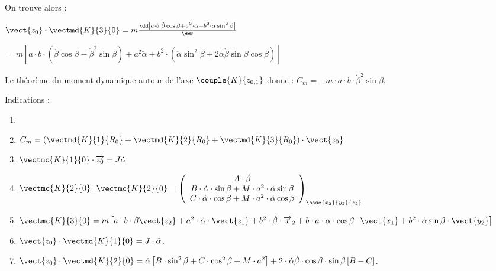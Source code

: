 \begin{multicols}{2}
\begin{corrige}
On trouve alors : 

$
\vect{z_0}\cdot \vectmd{K}{3}{0}=
m\frac{\dd\left[a\cdot b\cdot \dot{\beta}\cos\beta+a^2\cdot \dot{\alpha}+b^2\cdot \dot{\alpha}\sin^2\beta\right]}{\dd t}
$

$=m\left[a\cdot b\cdot \left(\ddot{\beta}\cos\beta-\dot{\beta}^2\sin\beta\right)+a^2\ddot{\alpha}+b^2\cdot\left(\ddot{\alpha}\sin^2\beta+2\dot{\alpha}\dot{\beta}\sin\beta\cos\beta\right)\right]
$

\end{corrige}
\else
\fi



\ifprof
\begin{corrige}
Le théorème du moment dynamique autour de l'axe $\couple{K}{{z}_{0,1}}$ donne :
$
C_m=-m\cdot a\cdot b\cdot \dot{\beta}^2\sin\beta
$.

\end{corrige}
\else
\fi


\ifprof
\else
\ifcolle
\else
\footnotesize
Indications : 
\begin{enumerate}
\item 
\item $C_m=\left(\vectmd{K}{1}{R_0}+\vectmd{K}{2}{R_0}+\vectmd{K}{3}{R_0}\right)\cdot \vect{z_0}$
\item  $ \vectmc{K}{1}{0}\cdot\overrightarrow{z_0} = J \dot{\alpha}$
\item  $\vectmc{K}{2}{0}$: $
\vectmc{K}{2}{0}=\left(
\begin{array}{c}
A\cdot \dot{\beta}\\
B\cdot \dot{\alpha}\cdot \sin\beta+M\cdot a^2\cdot \dot{\alpha}\sin\beta\\
C\cdot \dot{\alpha}\cdot \cos\beta+M\cdot a^2\cdot \dot{\alpha}\cos\beta\\
\end{array}
\right)_{\base{{x}_2}{{y}_2}{{z}_2}}\\
$
\item $
\vectmc{K}{3}{0}=m\left[a\cdot b\cdot\dot{\beta} \vect{z_2}+a^2\cdot \dot{\alpha}\cdot\vect{z_{1}}+b^2\cdot \dot{\beta}\cdot\overrightarrow{x}_2+b\cdot a\cdot \dot{\alpha}\cdot \cos\beta\cdot \vect{x_{1}}+b^2\cdot \dot{\alpha}\sin\beta\cdot \vect{y_{2}}\right]
$
\item $\vect{z_0}\cdot \vectmd{K}{1}{0}=J\cdot \ddot{\alpha}$.
\item $\vect{z_0}\cdot \vectmd{K}{2}{0}=\ddot{\alpha}\left[B\cdot \sin^2\beta+C\cdot \cos^2\beta+M\cdot a^2\right]
+2\cdot\dot{\alpha}\dot{\beta}\cdot \cos\beta\cdot \sin\beta\left[B-C\right]$.


\end{enumerate}
\end{multicols}
